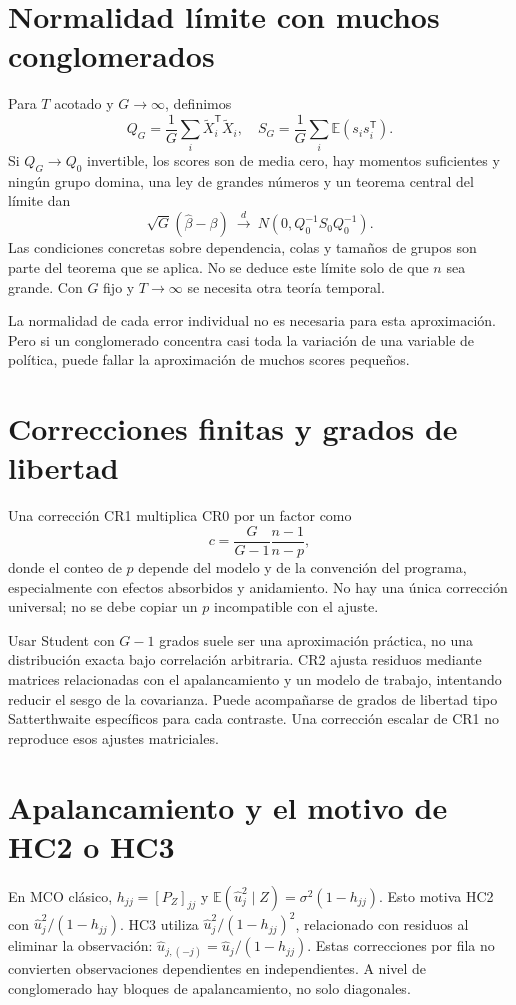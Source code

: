 \documentclass[11pt,a4paper]{article}
\newcommand{\E}{\mathbb E}
\newcommand{\T}{^{\mathsf T}}
\theoremstyle{definition}
\begin{document}
\section{Normalidad límite con muchos conglomerados}
Para $T$ acotado y $G\to\infty$, definimos
\[
Q_G=\frac1G\sum_i\widetilde X_i\T\widetilde X_i,\quad
S_G=\frac1G\sum_i\E(s_is_i\T).
\]
Si $Q_G\to Q_0$ invertible, los scores son de media cero, hay momentos suficientes y ningún grupo domina, una ley de grandes números y un teorema central del límite dan
\[
\sqrt G(\widehat\beta-\beta)
\ \overset d\longrightarrow\
N(0,Q_0^{-1}S_0Q_0^{-1}).
\]
Las condiciones concretas sobre dependencia, colas y tamaños de grupos son parte del teorema que se aplica. No se deduce este límite solo de que $n$ sea grande. Con $G$ fijo y $T\to\infty$ se necesita otra teoría temporal.

La normalidad de cada error individual no es necesaria para esta aproximación.
Pero si un conglomerado concentra casi toda la variación de una variable de política, puede fallar la aproximación de muchos scores pequeños.

\section{Correcciones finitas y grados de libertad}
Una corrección CR1 multiplica CR0 por un factor como
\[
c=\frac G{G-1}\frac{n-1}{n-p},
\]
donde el conteo de $p$ depende del modelo y de la convención del programa, especialmente con efectos absorbidos y anidamiento.
No hay una única corrección universal; no se debe copiar un $p$ incompatible con el ajuste.

Usar Student con $G-1$ grados suele ser una aproximación práctica, no una distribución exacta bajo correlación arbitraria.
CR2 ajusta residuos mediante matrices relacionadas con el apalancamiento y un modelo de trabajo, intentando reducir el sesgo de la covarianza.
Puede acompañarse de grados de libertad tipo Satterthwaite específicos para cada contraste.
Una corrección escalar de CR1 no reproduce esos ajustes matriciales.

\section{Apalancamiento y el motivo de HC2 o HC3}
En MCO clásico, $h_{jj}=[P_Z]_{jj}$ y
$\E(\widehat u_j^2\mid Z)=\sigma^2(1-h_{jj})$.
Esto motiva HC2 con $\widehat u_j^2/(1-h_{jj})$.
HC3 utiliza $\widehat u_j^2/(1-h_{jj})^2$, relacionado con residuos al eliminar la observación:
$\widehat u_{j,(-j)}=\widehat u_j/(1-h_{jj})$.
Estas correcciones por fila no convierten observaciones dependientes en independientes.
A nivel de conglomerado hay bloques de apalancamiento, no solo diagonales.
\end{document}
